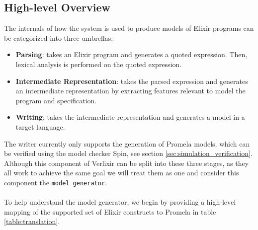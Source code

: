 \subsection{High-level Overview}
The internals of how the system is used to produce models of Elixir programs can be categorized into three umbrellas:
\begin{itemize}
    \item \textbf{Parsing}: takes an Elixir program and generates a quoted expression. Then, lexical analysis is performed on the quoted expression.
    \item \textbf{Intermediate Representation}: takes the parsed expression and generates an intermediate representation by extracting features relevant to model the program and specification.
    \item \textbf{Writing}: takes the intermediate representation and generates a model in a target language.
\end{itemize} 
The writer currently only supports the generation of Promela models, which can be verified using the model checker Spin, see section \ref{sec:simulation_verification}. Although this component of Verlixir can be split into these three stages, as they all work to achieve the same goal we will treat them as one and consider this component the \texttt{model generator}. 
\\ \\
To help understand the model generator, we begin by providing a high-level mapping of the supported set of Elixir constructs to Promela in table \ref{table:translation}.
\\ \\

